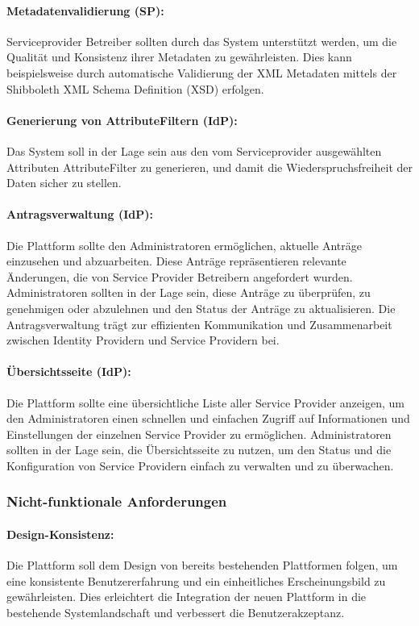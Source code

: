 \documentclass[a4paper, fontsize=11pt]{scrartcl}
\begin{document}
\paragraph{Metadatenvalidierung (SP):}
Serviceprovider Betreiber sollten durch das System unterstützt werden, um die Qualität und Konsistenz ihrer Metadaten zu gewährleisten.
Dies kann beispielsweise durch automatische Validierung der XML Metadaten mittels der Shibboleth XML Schema Definition (XSD) erfolgen.

\paragraph{Generierung von AttributeFiltern (IdP):}
Das System soll in der Lage sein aus den vom Serviceprovider ausgewählten Attributen AttributeFilter zu generieren, und damit die Wiederspruchsfreiheit der Daten sicher zu stellen.

\paragraph{Antragsverwaltung (IdP):}
Die Plattform sollte den Administratoren ermöglichen, aktuelle Anträge einzusehen und abzuarbeiten. Diese Anträge repräsentieren relevante Änderungen, die von Service Provider Betreibern angefordert wurden.
Administratoren sollten in der Lage sein, diese Anträge zu überprüfen, zu genehmigen oder abzulehnen und den Status der Anträge zu aktualisieren.
Die Antragsverwaltung trägt zur effizienten Kommunikation und Zusammenarbeit zwischen Identity Providern und Service Providern bei.

\paragraph{Übersichtsseite (IdP):}
Die Plattform sollte eine übersichtliche Liste aller Service Provider anzeigen, um den Administratoren einen schnellen und einfachen Zugriff auf Informationen und Einstellungen der einzelnen Service Provider zu ermöglichen.
Administratoren sollten in der Lage sein, die Übersichtsseite zu nutzen, um den Status und die Konfiguration von Service Providern einfach zu verwalten und zu überwachen.

\subsubsection{Nicht-funktionale Anforderungen}\label{subsubsec:non-functional-requirements}

\paragraph{Design-Konsistenz:}
Die Plattform soll dem Design von bereits bestehenden Plattformen folgen, um eine konsistente Benutzererfahrung und ein einheitliches Erscheinungsbild zu gewährleisten. 
Dies erleichtert die Integration der neuen Plattform in die bestehende Systemlandschaft und verbessert die Benutzerakzeptanz.
\end{document}

